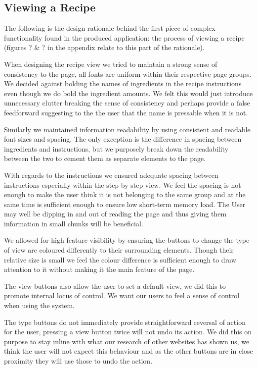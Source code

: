 \subsection{Viewing a Recipe}
The following is the design rationale behind the first piece of complex functionality found in the produced application: the process of viewing a recipe (figures ? \& ? in the appendix relate to this part of the rationale).

When designing the recipe view we tried to maintain a strong sense of consistency to the page, all fonts are uniform within their respective page groups. We decided against bolding the names of ingredients in the recipe instructions even though we do bold the ingredient amounts. We felt this would just introduce unnecessary clutter breaking the sense of consistency and perhaps provide a false feedforward suggesting to the the user that the name is pressable when it is not.

Similarly we maintained information readability by using consistent and readable font sizes and spacing. The only exception is the difference in spacing between ingredients and instructions, but we purposely break down the readability between the two to cement them as separate elements to the page.

With regards to the instructions we ensured adequate spacing between instructions especially within the step by step view. We feel the spacing is not enough to make the user think it is not belonging to the same group and at the same time is sufficient enough to ensure low short-term memory load. The User may well be dipping in and out of reading the page and thus giving them information in small chunks will be beneficial.

We allowed for high feature visibility by ensuring the buttons to change the type of view are coloured differently to their surrounding elements. Though their relative size is small we feel the colour difference is sufficient enough to draw attention to it without making it the main feature of the page.

The view buttons also allow the user to set a default view, we did this to promote internal locus of control. We want our users to feel a sense of control when using the system.

The type buttons do not immediately provide straightforward reversal of action for the user, pressing a view button twice will not undo its action. We did this on purpose to stay inline with what our research of other websites has shown us, we think the user will not expect this behaviour and as the other buttons are in close proximity they will use those to undo the action.


